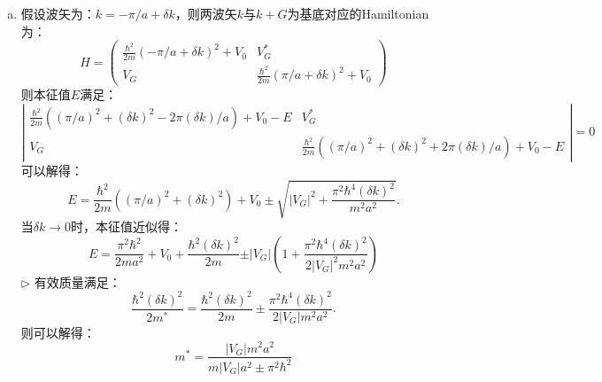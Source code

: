 \documentclass[reqno,a4paper,12pt]{amsart}
\begin{document}
\begin{enumerate}[1.]
\begin{tcolorbox}[breakable, colback = black!5!white, colframe = black]
\begin{enumerate}[(a)]
\item 假设波矢为：$k=-\pi/a + \delta k$，则两波矢$k$与$k+G$为基底对应的Hamiltonian为：
\[
	H = \begin{pmatrix}
		\frac{\hbar^2}{2m}(-\pi/a+\delta k)^2 + V_0 & V_G^* \\
		V_G & \frac{\hbar^2}{2m}(\pi/a+\delta k)^2 + V_0
	\end{pmatrix}
\]
则本征值$E$满足：
\[
	\left\vert \begin{matrix}
		\frac{\hbar^2}{2m}((\pi/a)^2 + (\delta k)^2 - 2\pi(\delta k)/a) + V_0 - E & V_G^* \\
		V_G & \frac{\hbar^2}{2m}((\pi/a)^2 + (\delta k)^2 + 2\pi(\delta k)/a) + V_0 - E
	\end{matrix} \right\vert = 0
\]
可以解得：
\[
	E = \frac{\hbar^2}{2m}((\pi/a)^2 + (\delta k)^2) + V_0 \pm \sqrt{\vert V_G \vert^2 + \frac{\pi^2\hbar^4(\delta k)^2}{m^2a^2}}.
\]
当$\delta k \to 0$时，本征值近似得：
\[
	E = \frac{\pi^2\hbar^2}{2ma^2} + V_0 + \frac{\hbar^2(\delta k)^2}{2m} \pm \vert V_G \vert \left( 1 + \frac{\pi^2\hbar^4(\delta k)^2}{2\vert V_G \vert^2m^2a^2} \right)
\]
$\triangleright$ 有效质量满足：
\[
	\frac{\hbar^2(\delta k)^2}{2m^*} = \frac{\hbar^2(\delta k)^2}{2m} \pm \frac{\pi^2\hbar^4(\delta k)^2}{2\vert V_G \vert m^2a^2}.
\]
则可以解得：
\[
	m^* = \frac{\vert V_G \vert m^2a^2}{m\vert V_G \vert a^2 \pm \pi^2\hbar^2}
\]
\end{enumerate}
\end{tcolorbox}


\end{enumerate}
\end{document}
